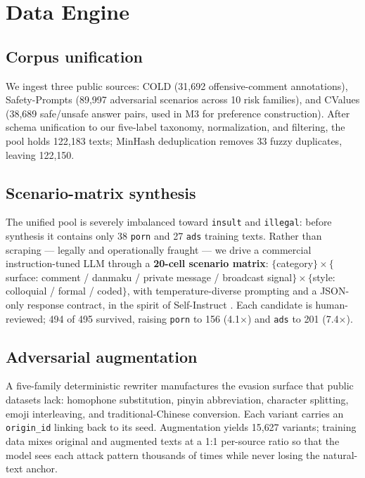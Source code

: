 \documentclass[11pt]{article}
\begin{document}
\section{Data Engine}

\subsection{Corpus unification}
We ingest three public sources: COLD (31{,}692 offensive-comment annotations), Safety-Prompts (89{,}997 adversarial scenarios across 10 risk families), and CValues (38{,}689 safe/unsafe answer pairs, used in M3 for preference construction). After schema unification to our five-label taxonomy, normalization, and filtering, the pool holds 122{,}183 texts; MinHash deduplication \citep{broder1997minhash} removes 33 fuzzy duplicates, leaving 122{,}150.

\subsection{Scenario-matrix synthesis}
The unified pool is severely imbalanced toward \texttt{insult} and \texttt{illegal}: before synthesis it contains only 38 \texttt{porn} and 27 \texttt{ads} training texts. Rather than scraping --- legally and operationally fraught --- we drive a commercial instruction-tuned LLM through a \textbf{20-cell scenario matrix}: $\{$category$\} \times \{$surface: comment / danmaku / private message / broadcast signal$\} \times \{$style: colloquial / formal / coded$\}$, with temperature-diverse prompting and a JSON-only response contract, in the spirit of Self-Instruct \citep{wang2023selfinstruct}. Each candidate is human-reviewed; 494 of 495 survived, raising \texttt{porn} to 156 (4.1$\times$) and \texttt{ads} to 201 (7.4$\times$).

\subsection{Adversarial augmentation}
A five-family deterministic rewriter manufactures the evasion surface that public datasets lack: homophone substitution, pinyin abbreviation, character splitting, emoji interleaving, and traditional-Chinese conversion. Each variant carries an \texttt{origin\_id} linking back to its seed. Augmentation yields 15{,}627 variants; training data mixes original and augmented texts at a 1:1 per-source ratio so that the model sees each attack pattern thousands of times while never losing the natural-text anchor.
\end{document}
